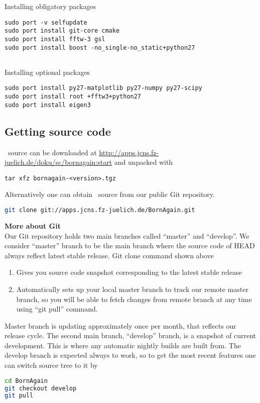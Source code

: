 \noindent
Installing obligatory packages
\begin{lstlisting}[language=shell, style=commandline]
sudo port -v selfupdate
sudo port install git-core cmake
sudo port install fftw-3 gsl
sudo port install boost -no_single-no_static+python27 


\end{lstlisting}

\noindent
Installing optional packages
\begin{lstlisting}[language=shell, style=commandline]
sudo port install py27-matplotlib py27-numpy py27-scipy
sudo port install root +fftw3+python27
sudo port install eigen3
\end{lstlisting}




\subsection{Getting source code}
\BornAgain\ source can be downloaded at \url{http://apps.jcns.fz-juelich.de/doku/sc/bornagain:start}
and unpacked with
\begin{lstlisting}[language=shell, style=commandline]
tar xfz bornagain-<version>.tgz
\end{lstlisting}

\noindent
Alternatively one can obtain \BornAgain\ source from our public Git repository.
\begin{lstlisting}[language=bash, style=commandline]
git clone git://apps.jcns.fz-juelich.de/BornAgain.git 
\end{lstlisting}
\vspace*{3mm}


\noindent
{\bf\large More about Git} \\
Our Git repository holds two main branches called ``master'' and ``develop''. We consider ``master''
branch to be the main branch where the source code of HEAD always reflect latest stable release. Git clone command shown above
\begin{enumerate}[1.]
\item Gives you source code snapshot corresponding to the latest stable release
\item Automatically sets up your local master branch to track our remote master branch, 
so you will be able to fetch changes from remote branch at any time using ``git pull'' command.
\end{enumerate}

Master branch is updating approximately once per month, that reflects our release cycle.
The second main branch, ``develop'' branch, is a snapshot of current development.
This is where any automatic nightly builds are built from. The develop branch is
expected always to work, so to get the most recent features one can switch source tree to it by
\begin{lstlisting}[language=bash, style=commandline]
cd BornAgain
git checkout develop
git pull
\end{lstlisting}
\vspace*{3mm}



